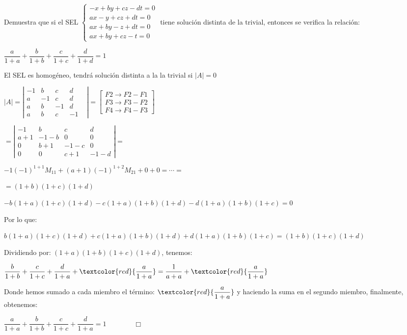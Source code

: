 \begin{ejre}
\small{Demuestra que si el SEL  $\begin{cases} -x+by+cz-dt=0\\ax-y+cz+dt=0\\	ax+by-z+dt=0\\ax+by+cz-t=0 \end{cases}$ tiene solución distinta de la trivial, entonces se verifica la relación:}

\normalsize{ $\dfrac {a}{1+a} +\dfrac {b}{1+b} +\dfrac {c}{1+c} +\dfrac {d}{1+d} =1$}
\end{ejre}


\begin{proofw}\renewcommand{\qedsymbol}{$\diamond$}

El SEL es homogéneo, tendrá solución distinta a la la trivial si $|A|=0$

\noindent $|A|=\left| \begin{matrix} -1&b&c&d\\a&-1&c&d&\\a&b&-1&d\\a&b&c&-1 \end{matrix} \right| = $\textcolor{gris}{$\left[ \begin{matrix}  F2\to F2-F1\\ F3\to F3-F2 \\F4 \to F4-F3 \end{matrix}  \right]$} 

$= \left| \begin{matrix} \boxed{-1}&b&c&d\\ \boxed{a+1}&-1-b&0&0\\\boxed{0}&b+1&-1-c&0\\\boxed{0}&0&c+1&-1-d \end{matrix} \right|= $

$-1(-1)^{1+1}M_{11}+(a+1)(-1)^{1+2}M_{21}+0+0=\cdots= $

$=(1+b)(1+c)(1+d)$

$-b(1+a)(1+c)(1+d)-c(1+a)(1+b)(1+d)-d(1+a)(1+b)(1+c)=0$

Por lo que: 

$b(1+a)(1+c)(1+d)+c(1+a)(1+b)(1+d)+d(1+a)(1+b)(1+c)=(1+b)(1+c)(1+d)$

Dividiendo por: $(1+a)(1+b)(1+c)(1+d)$, tenemos:

$\dfrac{b}{1+b} + \dfrac{c}{1+c} + \dfrac{d}{1+a} + \textcolor{red}{\dfrac{a}{1+a}} = \dfrac{1}{a+a} + \textcolor{red}{\dfrac{a}{1+a}}$

Donde hemos sumado a cada miembro el término: $\textcolor{red}{\dfrac{a}{1+a}}$ y haciendo la suma en el segundo miembro, finalmente, obtenemos:

$\dfrac {a}{1+a}+\dfrac{b}{1+b} + \dfrac{c}{1+c} + \dfrac{d}{1+a}=1 \qquad \qquad \Box$


	
\end{proofw}





